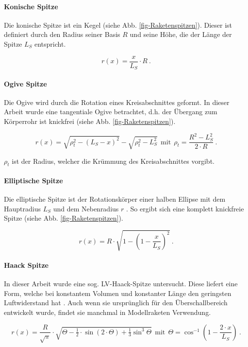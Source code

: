 \documentclass[10pt,a4paper]{article}
\begin{document}
\paragraph{Konische Spitze}

Die konische Spitze ist ein Kegel (siehe Abb. \ref{fig-Raketenspitzen}). Dieser ist definiert durch den Radius seiner Basis $R$ und seine Höhe, die der Länge der Spitze $L_{S}$ entspricht.

$$r(x)=\frac{x}{L_{S}} \cdot R \ .$$

\paragraph{Ogive Spitze}
Die Ogive wird durch die Rotation eines Kreisabschnittes geformt. In dieser Arbeit wurde eine tangentiale Ogive betrachtet, d.h. der Übergang zum Körperrohr ist knickfrei (siehe Abb. \ref{fig-Raketenspitzen}).

$$r(x)=\sqrt{\rho_{t}^{2}-(L_{S}-x)^{2}}-\sqrt{\rho_{t}^{2}-L_{S}^{2}} \ \
\text{mit} \ \
\rho_{t}=\frac{R^{2}-L_{S}^{2}}{2 \cdot R} \ .$$ 
  
\noindent
$\rho_{t}$ ist der Radius, welcher die Krümmung des Kreisabschnittes vorgibt.

\paragraph{Elliptische Spitze}
Die elliptische Spitze ist der Rotationskörper einer halben Ellipse mit dem Hauptradius $L_{S}$ und dem Nebenradius $r$ \cite{sn}. So ergibt sich eine komplett knickfreie Spitze (siehe Abb. \ref{fig-Raketenspitzen}).

$$r(x)=R \cdot \sqrt{1-\left( 1-\frac{x}{L_{S}}\right)  ^{2}} \ .$$

\paragraph{Haack Spitze}
In dieser Arbeit wurde eine sog. LV-Haack-Spitze untersucht. Diese liefert eine Form, welche bei konstantem Volumen und konstanter Länge den geringsten Luftwiderstand hat \cite{sn}. Auch wenn sie ursprünglich für den Überschallbereich entwickelt wurde, findet sie manchmal in Modellraketen Verwendung.

$$r(x)=\frac{R}{\sqrt{\pi}} \cdot \sqrt{\varTheta-\tfrac{1}{2} \cdot \sin(2 \cdot \varTheta)+\tfrac{1}{3} \sin^{3} \varTheta} \ \
\text{mit} \ \
\varTheta= \cos^{-1} \left( 1-\frac{2 \cdot x}{L_{S}}\right)  \ .$$
\end{document}
